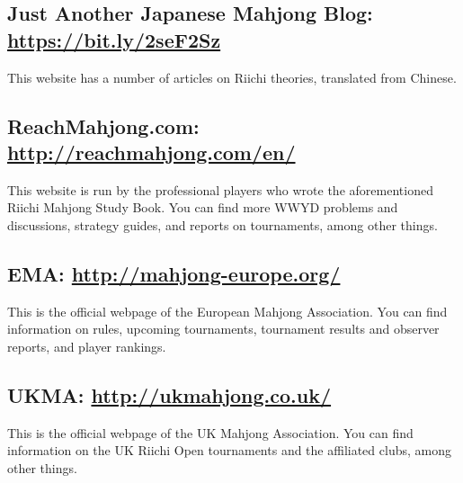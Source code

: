 \subsection*{Just Another Japanese Mahjong Blog: \\\url{https://bit.ly/2seF2Sz}}
This website has a number of articles on Riichi theories, translated from Chinese. 

\subsection*{ReachMahjong.com: \url{http://reachmahjong.com/en/}}
This website is run by the professional players who wrote the aforementioned Riichi Mahjong Study Book. You can find more WWYD problems and discussions, strategy guides, and reports on tournaments, among other things. 

\subsection*{EMA: \url{http://mahjong-europe.org/}} 
This is the official webpage of the European Mahjong Association. You can find information on rules, upcoming tournaments, tournament results and observer reports, and player rankings. 

\subsection*{UKMA: \url{http://ukmahjong.co.uk/}} 
This is the official webpage of the UK Mahjong Association. You can find information on the UK Riichi Open tournaments and the affiliated clubs, among other things. 

